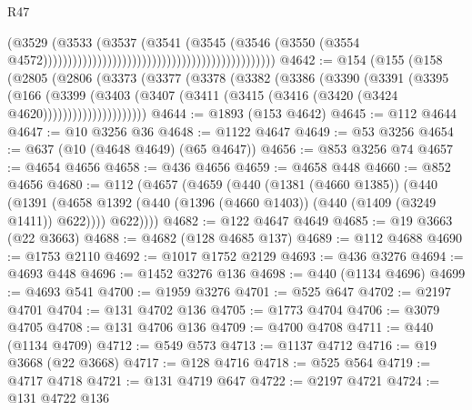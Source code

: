 \begin{lexlean}{R47}
\begin{coremodule}
                                                                                  (@3529
                                                                                    (@3533
                                                                                      (@3537
                                                                                        (@3541
                                                                                          (@3545
                                                                                            (@3546
                                                                                              (@3550
                                                                                                (@3554
                                                                                                  @4572)))))))))))))))))))))))))))))))))))))))))))))))
@4642 := @154
    (@155
      (@158
        (@2805
          (@2806
            (@3373
              (@3377
                (@3378
                  (@3382
                    (@3386
                      (@3390
                        (@3391
                          (@3395
                            (@166
                              (@3399
                                (@3403
                                  (@3407
                                    (@3411 (@3415 (@3416 (@3420 (@3424 @4620)))))))))))))))))))))
@4644 := @1893 (@153 @4642)
@4645 := @112 @4644
@4647 := @10 @3256 @36
@4648 := @1122 @4647
@4649 := @53 @3256
@4654 := @637 (@10 (@4648 @4649) (@65 @4647))
@4656 := @853 @3256 @74
@4657 := @4654 @4656
@4658 := @436 @4656
@4659 := @4658 @448
@4660 := @852 @4656
@4680 := @112
    (@4657
      (@4659
        (@440
          (@1381 (@4660 @1385))
          (@440
            (@1391 (@4658 @1392 (@440 (@1396 (@4660 @1403)) (@440 (@1409 (@3249 @1411)) @622))))
            @622))))
@4682 := @122 @4647 @4649
@4685 := @19 @3663 (@22 @3663)
@4688 := @4682 (@128 @4685 @137)
@4689 := @112 @4688
@4690 := @1753 @2110
@4692 := @1017 @1752 @2129
@4693 := @436 @3276
@4694 := @4693 @448
@4696 := @1452 @3276 @136
@4698 := @440 (@1134 @4696)
@4699 := @4693 @541
@4700 := @1959 @3276
@4701 := @525 @647
@4702 := @2197 @4701
@4704 := @131 @4702 @136
@4705 := @1773 @4704
@4706 := @3079 @4705
@4708 := @131 @4706 @136
@4709 := @4700 @4708
@4711 := @440 (@1134 @4709)
@4712 := @549 @573
@4713 := @1137 @4712
@4716 := @19 @3668 (@22 @3668)
@4717 := @128 @4716
@4718 := @525 @564
@4719 := @4717 @4718
@4721 := @131 @4719 @647
@4722 := @2197 @4721
@4724 := @131 @4722 @136

\end{coremodule}
\end{lexlean}
